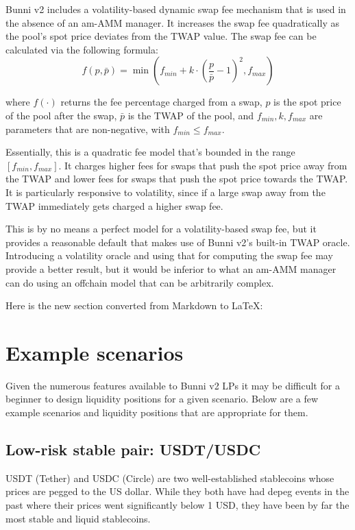 \documentclass[twocolumn]{article}
\begin{document}
Bunni v2 includes a volatility-based dynamic swap fee mechanism that is used in the absence of an am-AMM manager. It increases the swap fee quadratically as the pool's spot price deviates from the TWAP value. The swap fee can be calculated via the following formula:
\begin{equation}
  f(p, \bar p) = \min (f_{min} + k \cdot (\frac{p}{\bar p} - 1)^2, f_{max})
\end{equation}

where $f(\cdot)$ returns the fee percentage charged from a swap, $p$ is the spot price of the pool after the swap, $\bar p$ is the TWAP of the pool, and $f_{min}, k, f_{max}$ are parameters that are non-negative, with $f_{min} \le f_{max}$.

Essentially, this is a quadratic fee model that's bounded in the range $[f_{min}, f_{max}]$. It charges higher fees for swaps that push the spot price away from the TWAP and lower fees for swaps that push the spot price towards the TWAP. It is particularly responsive to volatility, since if a large swap away from the TWAP immediately gets charged a higher swap fee.

This is by no means a perfect model for a volatility-based swap fee, but it provides a reasonable default that makes use of Bunni v2's built-in TWAP oracle. Introducing a volatility oracle and using that for computing the swap fee may provide a better result, but it would be inferior to what an am-AMM manager can do using an offchain model that can be arbitrarily complex.

Here is the new section converted from Markdown to LaTeX:

\section{Example scenarios}

Given the numerous features available to Bunni v2 LPs it may be difficult for a beginner to design liquidity positions for a given scenario.  Below are a few example scenarios and liquidity positions that are appropriate for them.

\subsection{Low-risk stable pair: USDT/USDC}

USDT (Tether)\cite{Tether} and USDC (Circle)\cite{Circle} are two well-established stablecoins whose prices are pegged to the US dollar. While they both have had depeg events in the past where their prices went significantly below 1 USD, they have been by far the most stable and liquid stablecoins.
\end{document}
